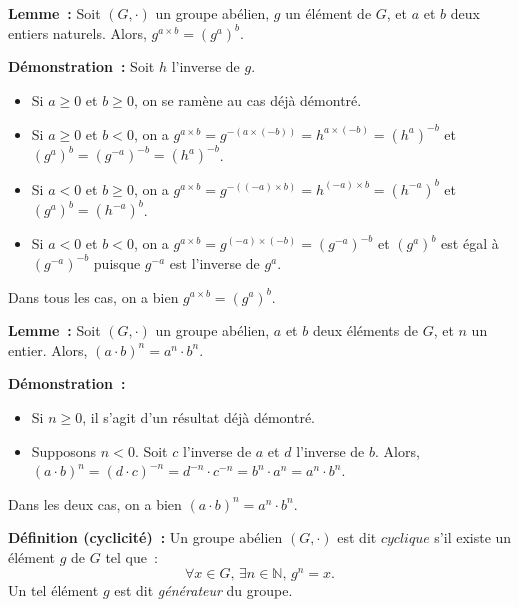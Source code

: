     \done

\medskip

\noindent\textbf{Lemme :} Soit $(G,\cdot)$ un groupe abélien, $g$ un élément de $G$, et $a$ et $b$ deux entiers naturels. 
    Alors, $g^{a \times b} = (g^a)^b$.

\medskip

\noindent\textbf{Démonstration :} Soit $h$ l'inverse de $g$. 
    \begin{itemize}[nosep]
        \item Si $a \geq 0$ et $b \geq 0$, on se ramène au cas déjà démontré.
        \item Si $a \geq 0$ et $b < 0$, on a $g^{a \times b} = g^{-(a \times (-b))} = h^{a \times (-b)} = (h^a)^{-b}$ et $(g^a)^b = (g^{-a})^{-b} = (h^a)^{-b}$.
        \item Si $a < 0$ et $b \geq 0$, on a $g^{a \times b} = g^{-((-a) \times b)} = h^{(-a) \times b} = (h^{-a})^b$ et $(g^a)^b = (h^{-a})^b$.
        \item Si $a < 0$ et $b < 0$, on a $g^{a \times b} = g^{(-a) \times (-b)} = (g^{-a})^{-b}$ et $(g^a)^b$ est égal à $(g^{-a})^{-b}$ puisque $g^{-a}$ est l'inverse de $g^a$.
    \end{itemize}
    Dans tous les cas, on a bien $g^{a \times b} = (g^a)^b$.

\medskip

\noindent\textbf{Lemme :} Soit $(G, \cdot)$ un groupe abélien, $a$ et $b$ deux éléments de $G$, et $n$ un entier. 
    Alors, $(a \cdot b)^n = a^n \cdot b^n$.

\medskip

\noindent\textbf{Démonstration :} 
\begin{itemize}[nosep]
    \item Si $n \geq 0$, il s'agit d'un résultat déjà démontré.
    \item Supposons $n < 0$. 
        Soit $c$ l'inverse de $a$ et $d$ l'inverse de $b$.
        Alors, $(a \cdot b)^n = (d \cdot c)^{-n} = d^{-n} \cdot c^{-n} = b^n \cdot a^n = a^n \cdot b^n$.
\end{itemize}
Dans les deux cas, on a bien $(a \cdot b)^n = a^n \cdot b^n$.

\done

\medskip

\noindent\textbf{Définition (cyclicité) :} Un groupe abélien $(G, \cdot)$ est dit $\textit{cyclique}$ s'il existe un élément $g$ de $G$ tel que : 
    \begin{equation*}
        \forall x \in G, \, \exists n \in \mathbb{N}, \, g^n = x.
    \end{equation*}
    Un tel élément $g$ est dit \textit{générateur} du groupe.

